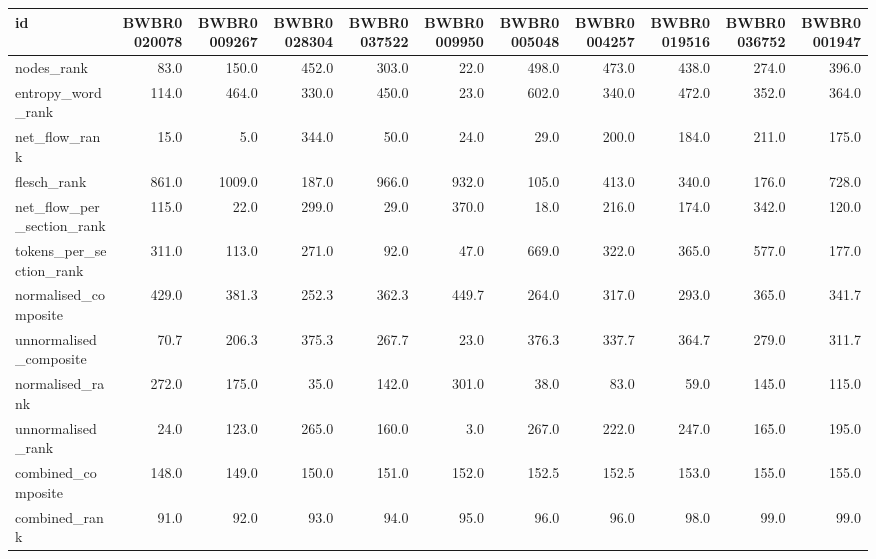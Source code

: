 \begin{tabular}{lrrrrrrrrrr}
\toprule
id & BWBR0020078 & BWBR0009267 & BWBR0028304 & BWBR0037522 & BWBR0009950 & BWBR0005048 & BWBR0004257 & BWBR0019516 & BWBR0036752 & BWBR0001947 \\
\midrule
nodes\_rank & 83.0 & 150.0 & 452.0 & 303.0 & 22.0 & 498.0 & 473.0 & 438.0 & 274.0 & 396.0 \\
\cline{1-11}
entropy\_word\_rank & 114.0 & 464.0 & 330.0 & 450.0 & 23.0 & 602.0 & 340.0 & 472.0 & 352.0 & 364.0 \\
\cline{1-11}
net\_flow\_rank & 15.0 & 5.0 & 344.0 & 50.0 & 24.0 & 29.0 & 200.0 & 184.0 & 211.0 & 175.0 \\
\cline{1-11}
flesch\_rank & 861.0 & 1009.0 & 187.0 & 966.0 & 932.0 & 105.0 & 413.0 & 340.0 & 176.0 & 728.0 \\
\cline{1-11}
net\_flow\_per\_section\_rank & 115.0 & 22.0 & 299.0 & 29.0 & 370.0 & 18.0 & 216.0 & 174.0 & 342.0 & 120.0 \\
\cline{1-11}
tokens\_per\_section\_rank & 311.0 & 113.0 & 271.0 & 92.0 & 47.0 & 669.0 & 322.0 & 365.0 & 577.0 & 177.0 \\
\cline{1-11}
normalised\_composite & 429.0 & 381.3 & 252.3 & 362.3 & 449.7 & 264.0 & 317.0 & 293.0 & 365.0 & 341.7 \\
\cline{1-11}
unnormalised\_composite & 70.7 & 206.3 & 375.3 & 267.7 & 23.0 & 376.3 & 337.7 & 364.7 & 279.0 & 311.7 \\
\cline{1-11}
normalised\_rank & 272.0 & 175.0 & 35.0 & 142.0 & 301.0 & 38.0 & 83.0 & 59.0 & 145.0 & 115.0 \\
\cline{1-11}
unnormalised\_rank & 24.0 & 123.0 & 265.0 & 160.0 & 3.0 & 267.0 & 222.0 & 247.0 & 165.0 & 195.0 \\
\cline{1-11}
combined\_composite & 148.0 & 149.0 & 150.0 & 151.0 & 152.0 & 152.5 & 152.5 & 153.0 & 155.0 & 155.0 \\
\cline{1-11}
combined\_rank & 91.0 & 92.0 & 93.0 & 94.0 & 95.0 & 96.0 & 96.0 & 98.0 & 99.0 & 99.0 \\
\cline{1-11}
\bottomrule
\end{tabular}
